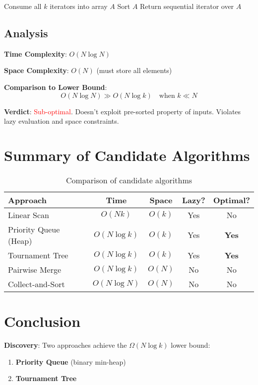 \documentclass[11pt]{article}
\begin{document}
\begin{algorithmic}
\State Consume all $k$ iterators into array $A$
\State Sort $A$
\State Return sequential iterator over $A$
\end{algorithmic}

\subsection{Analysis}

\textbf{Time Complexity}: $O(N \log N)$

\textbf{Space Complexity}: $O(N)$ (must store all elements)

\textbf{Comparison to Lower Bound}:
\[
O(N \log N) \gg O(N \log k) \quad \text{when } k \ll N
\]

\textbf{Verdict}: \textcolor{red}{Sub-optimal}. Doesn't exploit pre-sorted property of inputs. Violates lazy evaluation and space constraints.

\section{Summary of Candidate Algorithms}

\begin{table}[h]
\centering
\begin{tabular}{lcccc}
\toprule
\textbf{Approach} & \textbf{Time} & \textbf{Space} & \textbf{Lazy?} & \textbf{Optimal?} \\
\midrule
Linear Scan & $O(Nk)$ & $O(k)$ & Yes & No \\
Priority Queue (Heap) & $O(N \log k)$ & $O(k)$ & Yes & \textbf{Yes} \\
Tournament Tree & $O(N \log k)$ & $O(k)$ & Yes & \textbf{Yes} \\
Pairwise Merge & $O(N \log k)$ & $O(N)$ & No & No \\
Collect-and-Sort & $O(N \log N)$ & $O(N)$ & No & No \\
\bottomrule
\end{tabular}
\caption{Comparison of candidate algorithms}
\end{table}

\section{Conclusion}

\textbf{Discovery}: Two approaches achieve the $\Omega(N \log k)$ lower bound:
\begin{enumerate}
    \item \textbf{Priority Queue} (binary min-heap)
    \item \textbf{Tournament Tree}
\end{enumerate}
\end{document}
